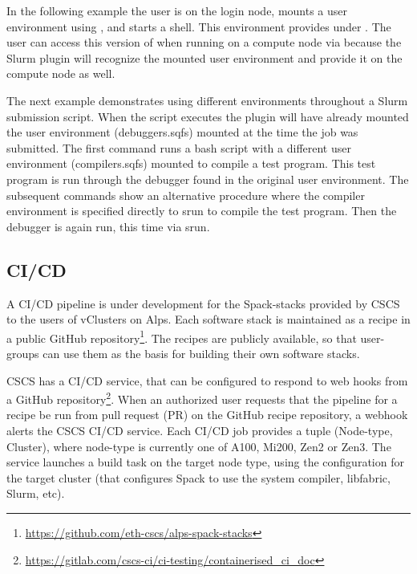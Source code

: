 In the following example the user is on the login node, mounts a user environment using , and starts a  shell.
This environment provides  under .
The user can access this version of  when running on a compute node via  because the Slurm plugin will recognize the mounted user environment and provide it on the compute node as well.



The next example demonstrates using different environments throughout a Slurm submission script.
When the script executes the plugin will have already mounted the user environment (debuggers.sqfs) mounted at the time the job was submitted.
The first command runs a bash script with a different user environment (compilers.sqfs) mounted to compile a test program.
This test program is run through the debugger found in the original user environment.
The subsequent commands show an alternative procedure where the compiler environment is specified directly to srun to compile the test program.
Then the debugger is again run, this time via srun.



\subsection{CI/CD}

A CI/CD pipeline is under development for the Spack-stacks provided by CSCS to the users of vClusters on Alps.
Each software stack is maintained as a \stackinator recipe in a public GitHub repository\footnote{\url{https://github.com/eth-cscs/alps-spack-stacks}}.
The recipes are publicly available, so that user-groups can use them as the basis for building their own software stacks.

CSCS has a CI/CD service, that can be configured to respond to web hooks from a GitHub repository\footnote{\url{https://gitlab.com/cscs-ci/ci-testing/containerised_ci_doc}}.
When an authorized user requests that the pipeline for a recipe be run from pull request (PR) on the GitHub recipe repository, a webhook alerts the CSCS CI/CD service.
Each CI/CD job provides a tuple {\sf (Node-type, Cluster)}, where node-type is currently one of A100, Mi200, Zen2 or Zen3.
The service launches a build task on the target node type, using the configuration for the target cluster (that configures Spack to use the system compiler, libfabric, Slurm, etc).

